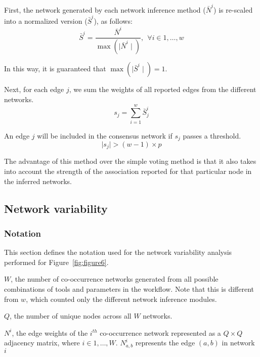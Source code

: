   First, the network generated by each network inference method ($\bar{N}^i$) is re-scaled into a normalized version ($\bar{S}^i$), as follows:
  \begin{equation}
    \bar{S}^{i} = \frac{\bar{N}^{i}}{\max(\mid \bar{N}^{i} \mid)},~~\forall i \in {1, \dots, w}
    \label{eqn:scaled-sum-rescaling}
  \end{equation}

    In this way, it is guaranteed that $\max(\mid \bar{S}^i \mid) = 1$.


  Next, for each edge $j$, we sum the weights of all reported edges from the different networks.
  \begin{equation}
    s_j = \sum_{i=1}^{w} \bar{S}^i_j
    \label{eqn:scaled-sum}
  \end{equation}


  An edge $j$ will be included in the consensus network if $s_j$ passes a threshold.
  \begin{equation}
    \mid s_j \mid > (w - 1) \times p
    \label{eq:scaled-sum2}
  \end{equation}

  The advantage of this method over the simple voting method is that it also takes into account the strength of the association reported for that particular node in the inferred networks.

  \subsection*{Network variability}

  \subsubsection*{Notation}
  \vspace{-5mm}
  This section defines the notation used for the network variability analysis performed for Figure~\ref{fig:figure6}.

  $W$, the number of co-occurrence networks generated from all possible combinations of tools and parameters in the workflow.
  Note that this is different from $w$, which counted only the different network inference modules.

  $Q$, the number of unique nodes across all $W$ networks.

  $N^i$, the edge weights of the $i^{th}$ co-occurrence network represented as a $Q \times Q$ adjacency matrix, where $i \in {1, \dots, W}$.
  $N^i_{a,b}$ represents the edge $(a,b)$ in network $i$

